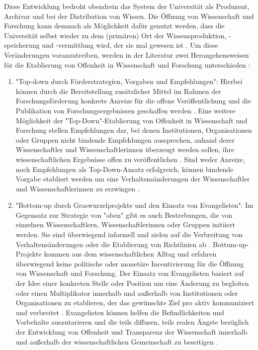 Diese Entwicklung bedroht obendrein das System der Universität als Produzent, Archivar und bei der Distribution von Wissen. Die Öffnung von Wissenschaft und Forschung kann demnach als Möglichkeit dafür genutzt werden, dass die Universität selbst wieder zu dem (primären) Ort der Wissensproduktion, -speicherung und -vermittlung wird, der sie mal gewesen ist \cite{kittler_2004}. Um diese Veränderungen voranzutreiben, werden in der Literatur zwei Herangehensweisen für die Etablierung von Offenheit in Wissenschaft und Forschung unterschieden \cite{schulze_2013_open}:
\begin{enumerate}
\item "Top-down durch Förderstrategien, Vorgaben und Empfehlungen": Hierbei können durch die Bereitstellung zusätzlicher Mittel im Rahmen der Forschungsförderung konkrete Anreize für die offene Veröffentlichung und die Publikation von Forschungsergebnissen geschaffen werden \cite{suchen}. Eine weitere Möglichkeit der "Top-Down"-Etablierung von Offenheit in Wissenschaft und Forschung stellen Empfehlungen dar, bei denen Institutionen, Organisationen oder Gruppen nicht bindende Empfehlungen aussprechen, anhand derer Wissenschaftler und Wissenschaftlerinnen überzeugt werden sollen, ihre wissenschaftlichen Ergebnisse offen zu veröffentlichen \cite{suchen}. Sind weder Anreize, noch Empfehlungen als Top-Down-Ansatz erfolgreich, können bindende Vorgabe etabliert werden um eine Verhaltensänderungen der Wissenschaftler und Wissenschaftlerinnen zu erzwingen \cite{suchen}.
\item "Bottom-up durch Graswurzelprojekte und den Einsatz von Evangelisten":
Im Gegensatz zur Strategie von "oben" gibt es auch Bestrebungen, die von einzelnen Wissenschaftlern, Wissenschaftlerinnen oder Gruppen initiiert werden. Sie sind überwiegend informell und zielen auf die Verbreitung von Verhaltensänderungen oder die Etablierung von Richtlinien ab \cite{suchen}. Bottum-up-Projekte kommen aus dem wissenschaftlichen Alltag und erfahren überwiegend keine politische oder monetäre Incentivierung für die Öffnung von Wissenschaft und Forschung. Der Einsatz von Evangelisten basiert auf der Idee einer konkreten Stelle oder Position um eine Änderung zu begleiten \cite{suchen} oder einen Multiplikator innerhalb und außerhalb von Institutionen oder Organisationen zu etablieren, der das gewünschte Ziel pro aktiv kommuniziert und verbreitet \cite{suchen}. Evangelisten können helfen die Befindlichkeiten und Vorbehalte auszutarieren und die teils diffusen, teils realen Ängste bezüglich der Entwicklung von Offenheit und Transparenz der Wissenschaft innerhalb und außerhalb der wissenschaftlichen Gemeinschaft zu beseitigen \cite{schulze_2013_open}.
\end{enumerate}


